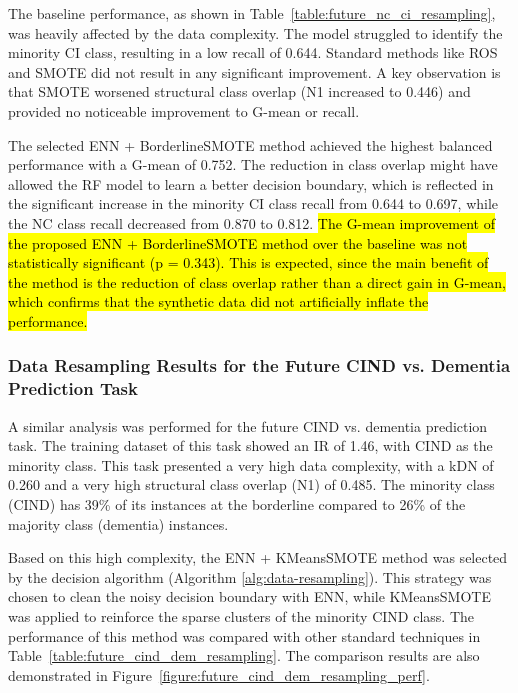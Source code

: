 The baseline performance, as shown in Table~\ref{table:future_nc_ci_resampling}, was heavily affected by the data complexity. The model struggled to identify the minority CI class, resulting in a low recall of 0.644. Standard methods like ROS and SMOTE did not result in any significant improvement. A key observation is that SMOTE worsened structural class overlap (N1 increased to 0.446) and provided no noticeable improvement to G-mean or recall.

The selected ENN + BorderlineSMOTE method achieved the highest balanced performance with a G-mean of 0.752. The reduction in class overlap might have allowed the RF model to learn a better decision boundary, which is reflected in the significant increase in the minority CI class recall from 0.644 to 0.697, while the NC class recall decreased from 0.870 to 0.812. \hl{The G-mean improvement of the proposed ENN + BorderlineSMOTE method over the baseline was not statistically significant (p = 0.343). This is expected, since the main benefit of the method is the reduction of class overlap rather than a direct gain in G-mean, which confirms that the synthetic data did not artificially inflate the performance.}

\subsubsection{Data Resampling Results for the Future CIND vs. Dementia Prediction Task}
\label{sec:resampling_future_cind_dem}
A similar analysis was performed for the future CIND vs. dementia prediction task. The training dataset of this task showed an IR of 1.46, with CIND as the minority class. This task presented a very high data complexity, with a kDN of 0.260 and a very high structural class overlap (N1) of 0.485. The minority class (CIND) has 39\% of its instances at the borderline compared to 26\% of the majority class (dementia) instances.

Based on this high complexity, the ENN + KMeansSMOTE method was selected by the decision algorithm (Algorithm \ref{alg:data-resampling}). This strategy was chosen to clean the noisy decision boundary with ENN, while KMeansSMOTE was applied to reinforce the sparse clusters of the minority CIND class. The performance of this method was compared with other standard techniques in Table~\ref{table:future_cind_dem_resampling}. The comparison results are also demonstrated in Figure~\ref{figure:future_cind_dem_resampling_perf}.

